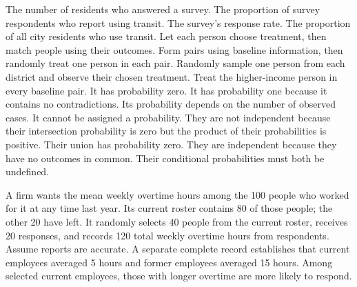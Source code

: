 \documentclass[11pt]{article}
\begin{document}
{The number of residents who answered a survey.}
{The proportion of survey respondents who report using transit.}
{The survey's response rate.}
{The proportion of all city residents who use transit.}
{Let each person choose treatment, then match people using their outcomes.}
{Form pairs using baseline information, then randomly treat one person in each pair.}
{Randomly sample one person from each district and observe their chosen treatment.}
{Treat the higher-income person in every baseline pair.}
{It has probability zero.}
{It has probability one because it contains no contradictions.}
{Its probability depends on the number of observed cases.}
{It cannot be assigned a probability.}
{They are not independent because their intersection probability is zero but the product of their probabilities is positive.}
{Their union has probability zero.}
{They are independent because they have no outcomes in common.}
{Their conditional probabilities must both be undefined.}

\label{reference-formulas}

A firm wants the mean weekly overtime hours among the 100 people who worked for it at any time last year. Its current roster contains 80 of those people; the other 20 have left. It randomly selects 40 people from the current roster, receives 20 responses, and records 120 total weekly overtime hours from respondents. Assume reports are accurate. A separate complete record establishes that current employees averaged 5 hours and former employees averaged 15 hours. Among selected current employees, those with longer overtime are more likely to respond.
\begin{parts}
\end{parts}
\end{document}
